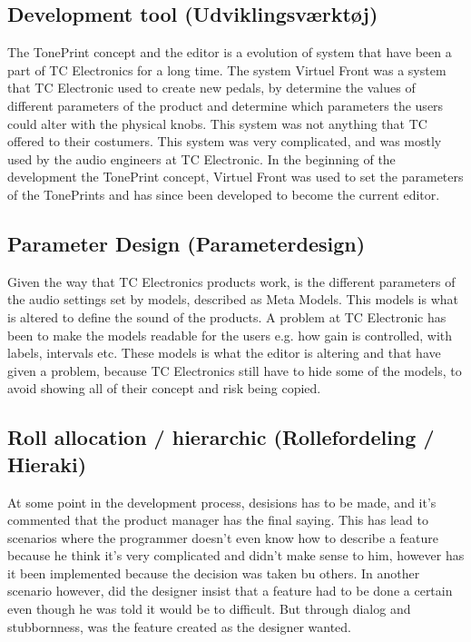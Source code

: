 \subsection*{Development tool (Udviklingsværktøj)}
\label{ThemeDevelopmentTool}
The TonePrint concept and the editor is a evolution of system that have been a part of TC Electronics for a long time. The system Virtuel Front was a system that TC Electronic used to create new pedals, by determine the values of different parameters of the product and determine which parameters the users could alter with the physical knobs. This system was not anything that TC offered to their costumers. This system was very complicated, and was mostly used by the audio engineers at TC Electronic. In the beginning of the development the TonePrint concept, Virtuel Front was used to set the parameters of the TonePrints and has since been developed to become the current editor. 

\subsection*{Parameter Design (Parameterdesign)}
\label{ThemeParameterDesign}
Given the way that TC Electronics products work, is the different parameters of the audio settings set by models, described as Meta Models. This models is what is altered to define the sound of the products. A problem at TC Electronic has been to make the models readable for the users e.g. how gain is controlled, with labels, intervals etc. These models is what the editor is altering and that have given a problem, because TC Electronics still have to hide some of the models, to avoid showing all of their concept and risk being copied. 

\subsection*{Roll allocation / hierarchic (Rollefordeling / Hieraki)}
\label{ThemeRollAllocation}
At some point in the development process, desisions has to be made, and it's commented that the product manager has the final saying. This has lead to scenarios where the programmer doesn't even know how to describe a feature because he think it's very complicated and didn't make sense to him, however has it been implemented because the decision was taken bu others. In another scenario however, did the designer insist that a feature had to be done a certain even though he was told it would be to difficult. But through dialog and stubbornness, was the feature created as the designer wanted.

